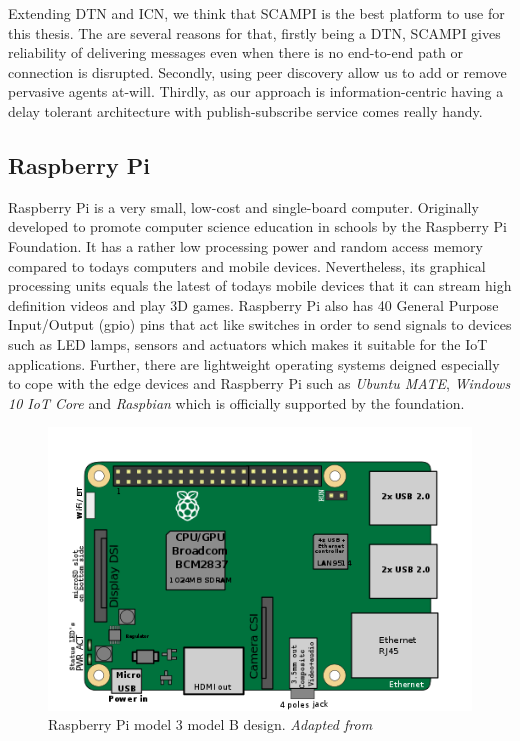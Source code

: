 \noindent Extending DTN and ICN, we think that SCAMPI is the best platform to use for this thesis. The are several reasons for that, firstly being a DTN, SCAMPI gives reliability of delivering messages even when there is no end-to-end path or connection is disrupted. Secondly, using peer discovery allow us to add or remove pervasive agents at-will. Thirdly, as our approach is information-centric having a delay tolerant architecture with publish-subscribe service comes really handy. 



\subsection{Raspberry Pi}
Raspberry Pi is a very small, low-cost and single-board computer.  Originally developed to promote computer science education in schools by the Raspberry Pi Foundation. It has a rather low processing power and random access memory compared to todays computers and mobile devices. Nevertheless, its graphical processing units equals the latest of todays mobile devices that it can stream high definition videos and play 3D games. Raspberry Pi also has 40 General Purpose Input/Output (gpio) pins that act like switches in order to send signals to devices such as LED lamps, sensors and actuators which makes it suitable for the IoT applications. Further, there are lightweight operating systems deigned especially to cope with the edge devices and Raspberry Pi  such as \textit{Ubuntu MATE},  \textit{Windows 10 IoT Core} and \textit{Raspbian} which is officially supported by the foundation.
\begin{figure}[H]
	\centering
	\includegraphics[scale=0.5]{images/rpi.png}
	\caption{Raspberry Pi model 3 model B design. \textit{Adapted from \cite{RASPI}}}
	\label{fig:rpi}
\end{figure}
